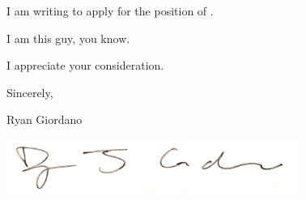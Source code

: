 \vspace{1em}
I am writing to apply for the position of \position.

\vspace{1em}
I am this guy, you know.

\vspace{1em}
\deptspecific

\vspace{1em} I appreciate your consideration.

\vspace{1em} Sincerely,

\vspace{1em} Ryan Giordano

\hspace{-1em}\includegraphics[height=0.7in]{static_images/sig.jpg}


